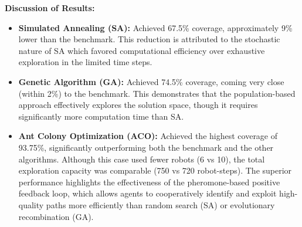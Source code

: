 \noindent
\textbf{Discussion of Results:}  
\begin{itemize}
    \item \textbf{Simulated Annealing (SA):} Achieved 67.5\% coverage, approximately 9\% lower than the benchmark. This reduction is attributed to the stochastic nature of SA which favored computational efficiency over exhaustive exploration in the limited time steps.
    
    \item \textbf{Genetic Algorithm (GA):} Achieved 74.5\% coverage, coming very close (within 2\%) to the benchmark. This demonstrates that the population-based approach effectively explores the solution space, though it requires significantly more computation time than SA.
    
    \item \textbf{Ant Colony Optimization (ACO):} Achieved the highest coverage of 93.75\%, significantly outperforming both the benchmark and the other algorithms. Although this case used fewer robots (6 vs 10), the total exploration capacity was comparable (750 vs 720 robot-steps). The superior performance highlights the effectiveness of the pheromone-based positive feedback loop, which allows agents to cooperatively identify and exploit high-quality paths more efficiently than random search (SA) or evolutionary recombination (GA).
\end{itemize}
